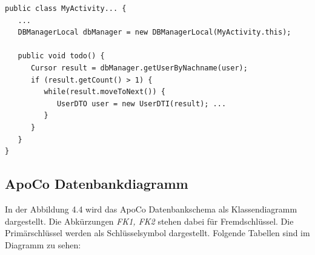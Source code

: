 \begin{lstlisting}[caption={Methode \emph{getUserByNachname()} der \emph{DBManagerLocal}-Klasse}]
public class MyActivity... {
   ...    
   DBManagerLocal dbManager = new DBManagerLocal(MyActivity.this);      
   
   public void todo() {         
      Cursor result = dbManager.getUserByNachname(user);      
      if (result.getCount() > 1) {      
         while(result.moveToNext()) {         
            UserDTO user = new UserDTI(result); ...
         }
      }
   }
}
\end{lstlisting}

\subsection{ApoCo Datenbankdiagramm}

In der Abbildung 4.4 wird das ApoCo Datenbankschema als Klassendiagramm dargestellt.
Die Abk\"urzungen \emph{FK1, FK2} stehen dabei f\"ur Fremdschl\"ussel. Die Prim\"arschl\"ussel werden als Schl\"usselsymbol dargestellt.
Folgende Tabellen sind im Diagramm zu sehen:

